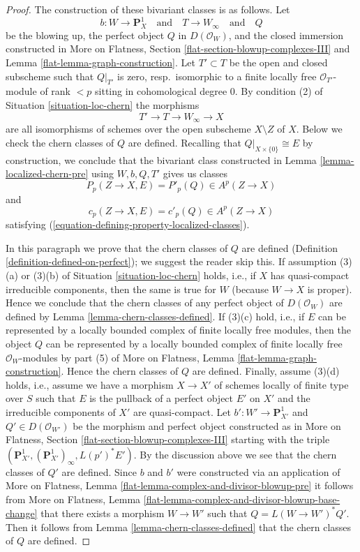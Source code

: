 \begin{proof}
The construction of these bivariant classes is as follows. Let
$$
b : W \longrightarrow \mathbf{P}^1_X
\quad\text{and}\quad
T \longrightarrow W_\infty
\quad\text{and}\quad
Q
$$
be the blowing up, the perfect object $Q$ in $D(\mathcal{O}_W)$,
and the closed immersion constructed in
More on Flatness, Section \ref{flat-section-blowup-complexes-III}
and Lemma \ref{flat-lemma-graph-construction}.
Let $T' \subset T$ be the open and closed subscheme such that
$Q|_{T'}$ is zero, resp.\ isomorphic to a
finite locally free $\mathcal{O}_{T'}$-module of rank $< p$
sitting in cohomological degree $0$. By condition (2) of
Situation \ref{situation-loc-chern} the morphisms
$$
T' \to T \to W_\infty \to X
$$
are all isomorphisms of schemes over the open subscheme $X \setminus Z$ of $X$.
Below we check the chern classes of $Q$ are defined.
Recalling that $Q|_{X \times \{0\}} \cong E$ by construction, we conclude
that the bivariant class constructed in Lemma \ref{lemma-localized-chern-pre}
using $W, b, Q, T'$ gives us classes
$$
P_p(Z \to X, E) = P'_p(Q) \in A^p(Z \to X)
$$
and
$$
c_p(Z \to X, E) = c'_p(Q) \in A^p(Z \to X)
$$
satisfying (\ref{equation-defining-property-localized-classes}).

\medskip\noindent
In this paragraph we prove that the chern classes of $Q$ are defined
(Definition \ref{definition-defined-on-perfect}); we suggest the reader skip
this. If assumption (3)(a) or (3)(b) of Situation \ref{situation-loc-chern}
holds, i.e., if $X$ has quasi-compact irreducible components, then the
same is true for $W$ (because $W \to X$ is proper). Hence we conclude that
the chern classes of any perfect object of $D(\mathcal{O}_W)$ are defined by
Lemma \ref{lemma-chern-classes-defined}. If (3)(c) hold, i.e., if
$E$ can be represented by a locally bounded complex of finite locally
free modules, then the object $Q$ can be represented by a locally bounded
complex of finite locally free $\mathcal{O}_W$-modules by part (5) of
More on Flatness, Lemma \ref{flat-lemma-graph-construction}. Hence the
chern classes of $Q$ are defined. Finally, assume (3)(d) holds, i.e.,
assume we have a morphism $X \to X'$ of schemes locally of finite type
over $S$ such that $E$ is the pullback of a perfect object $E'$ on $X'$ and
the irreducible components of $X'$ are quasi-compact.
Let $b' : W' \to \mathbf{P}^1_{X'}$ and $Q' \in D(\mathcal{O}_{W'})$
be the morphism and perfect object constructed as
in More on Flatness, Section \ref{flat-section-blowup-complexes-III}
starting with the triple
$(\mathbf{P}^1_{X'}, (\mathbf{P}^1_{X'})_\infty, L(p')^*E')$.
By the discussion above we see that the chern classes of $Q'$
are defined. Since $b$ and $b'$ were constructed via an application of
More on Flatness, Lemma \ref{flat-lemma-complex-and-divisor-blowup-pre}
it follows from
More on Flatness, Lemma \ref{flat-lemma-complex-and-divisor-blowup-base-change}
that there exists a morphism $W \to W'$ such that
$Q = L(W \to W')^*Q'$. Then it follows from
Lemma \ref{lemma-chern-classes-defined}
that the chern classes of $Q$ are defined.
\end{proof}

